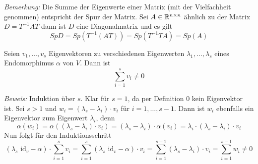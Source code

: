 \textit{Bemerkung:}
    Die Summe der Eigenwerte einer Matrix (mit der Vielfachheit genommen) entspricht der Spur der Matrix. Sei $A\in \mathbb{R}^{n \times n}$ ähnlich zu der 
    Matrix $D=T^{-1}AT$ dann ist $D$ eine Diagonalmatrix und es gilt
    \begin{equation*}
        Sp D = Sp(T^{-1}(AT))=Sp(T^{-1}TA)=Sp(A)
    \end{equation*} 
\begin{mylemma}\label{lemdiag} \qquad \par
    Seien $v_1,\ldots,v_s$ Eigenvektoren zu verschiedenen Eigenwerten $\lambda_1,\ldots,\lambda_s$ eines Endomorphimus $\alpha$ von $V$. Dann ist
    \begin{equation*}
        \sum_{i=1}^s v_i \neq 0
    \end{equation*}

\textit{Beweis:}
    Induktion über $s$. Klar für $s=1$, da per Definition $0$ kein Eigenvektor ist. Sei $s>1$ und $w_i=(\lambda_s-\lambda_i)\cdot v_i$ für $i=1,\ldots,s-1$. Dann ist $w_i$ ebenfalls ein Eigenvektor zum Eigenwert $\lambda_i$, denn
    \begin{equation*}
        \alpha(w_i)=\alpha((\lambda_s-\lambda_i)\cdot v_i)=(\lambda_s-\lambda_i)\cdot \alpha(v_i)= \lambda_i\cdot (\lambda_s-\lambda_i)\cdot v_i
    \end{equation*}
    Nun folgt für den Induktionsschritt
    \begin{equation*}
        (\lambda_s\mbox{ id}_v - \alpha)\cdot \sum_{i=1}^s v_i = \sum_{i=1}^s (\lambda_s\mbox{ id}_v - \alpha)\cdot v_i
        =\sum_{i=1}^{s-1} (\lambda_s-\lambda_i)\cdot v_i = \sum_{i=1}^{s-1} w_i \neq 0
    \end{equation*}
\end{mylemma}


